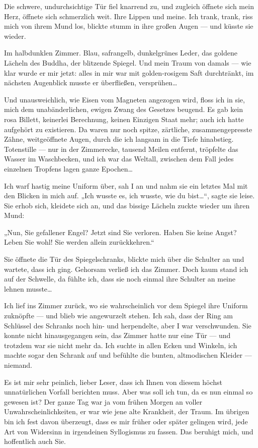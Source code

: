 Die schwere, undurchsichtige Tür fiel knarrend zu, und zugleich
öffnete sich mein Herz, öffnete sich schmerzlich weit. Ihre Lippen
und meine. Ich trank, trank, riss mich von ihrem Mund los, blickte
stumm in ihre großen Augen — und küsste sie wieder.

Im halbdunklen Zimmer. Blau, safrangelb, dunkelgrünes Leder, das
goldene Lächeln des Buddha, der blitzende Spiegel. Und mein Traum
von damals — wie klar wurde er mir jetzt: alles in mir war mit
golden-rosigem Saft durchtränkt, im nächsten Augenblick musste er
überfließen, versprühen\ldots{}

Und unausweichlich, wie Eisen vom Magneten angezogen wird, floss
ich in sie, mich dem unabänderlichen, ewigen Zwang des Gesetzes
beugend. Es gab kein rosa Billett, keinerlei Berechnung, keinen
Einzigen Staat mehr; auch ich hatte aufgehört zu existieren. Da
waren nur noch spitze, zärtliche, zusammengepresste Zähne,
weitgeöffnete Augen, durch die ich langsam in die Tiefe hinabstieg.
Totenstille — nur in der Zimmerecke, tausend Meilen entfernt,
tröpfelte das Wasser im Waschbecken, und ich war
das Weltall, zwischen dem Fall jedes einzelnen Tropfens lagen ganze
Epochen\ldots{}

Ich warf hastig meine Uniform über, sah I an und nahm sie ein
letztes Mal mit den Blicken in mich auf. „Ich wusste es, ich
wusste, wie du bist\ldots{}“, sagte sie leise. Sie erhob sich, kleidete
sich an, und das bissige Lächeln zuckte wieder um ihren Mund:

„Nun, Sie gefallener Engel? Jetzt sind Sie verloren. Haben Sie
keine Angst? Leben Sie wohl! Sie werden allein zurückkehren.“

Sie öffnete die Tür des Spiegelschranks, blickte mich über die
Schulter an und wartete, dass ich ging. Gehorsam verließ ich das
Zimmer. Doch kaum stand ich auf der Schwelle, da fühlte ich, dass
sie noch einmal ihre Schulter an meine lehnen musste\ldots{}

Ich lief ins Zimmer zurück, wo sie wahrscheinlich vor dem Spiegel
ihre Uniform zuknöpfte — und blieb wie angewurzelt stehen. Ich sah,
dass der Ring am Schlüssel des Schranks noch hin- und herpendelte,
aber I war verschwunden. Sie konnte nicht hinausgegangen sein, das
Zimmer hatte nur eine Tür — und trotzdem war sie nicht mehr da. Ich
suchte in allen Ecken und Winkeln, ich machte sogar den Schrank auf
und befühlte die bunten, altmodischen Kleider — niemand.

Es ist mir sehr peinlich, lieber Leser, dass ich Ihnen von diesem
höchst unnatürlichen Vorfall berichten muss. Aber was soll ich tun,
da es nun einmal so gewesen ist? Der ganze Tag war ja vom frühen
Morgen an voller Unwahrscheinlichkeiten, er war wie jene alte
Krankheit, der Traum. Im übrigen bin ich fest davon überzeugt, dass
es mir früher oder später gelingen wird, jede Art von Widersinn in
irgendeinen Syllogismus zu fassen. Das beruhigt mich, und
hoffentlich auch Sie.

